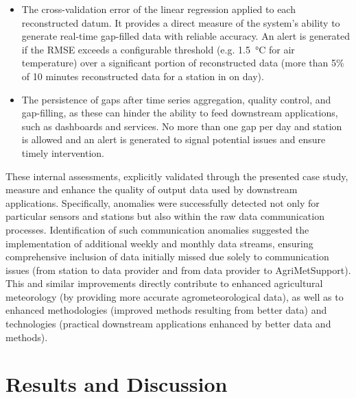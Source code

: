 \documentclass[authoryear,preprint,review,12pt]{elsarticle}
\begin{document}
{\begin{itemize}
    \item The cross-validation error of the linear regression applied to each reconstructed datum.
    It provides a direct measure of the system’s ability to generate real-time gap-filled data with reliable accuracy. 
    An alert is generated if the RMSE exceeds a configurable threshold (e.g. \SI{1.5}{\degreeCelsius} for air temperature) over a significant portion of reconstructed data (more than 5\% of 10 minutes reconstructed data for a station in on day).
    \item The persistence of gaps after time series aggregation, quality control, and gap-filling, as these can hinder the ability to feed downstream applications, such as dashboards and services. No more than one gap per day and station is allowed and an alert is generated to signal potential issues and ensure timely intervention.
\end{itemize}
These internal assessments, explicitly validated through the presented case study, measure and enhance the quality of output data used by downstream applications.
Specifically, anomalies were successfully detected not only for particular sensors and stations but also within the raw data communication processes.
Identification of such communication anomalies suggested the implementation of additional weekly and monthly data streams, ensuring comprehensive inclusion of data initially missed due solely to communication issues (from station to data provider and from data provider to AgriMetSupport).
This and similar improvements directly contribute to enhanced agricultural meteorology (by providing more accurate agrometeorological data), as well as to enhanced methodologies (improved methods resulting from better data) and technologies (practical downstream applications enhanced by better data and methods).
}

\section{Results and Discussion} \label{Results-Discussion}
\end{document}
